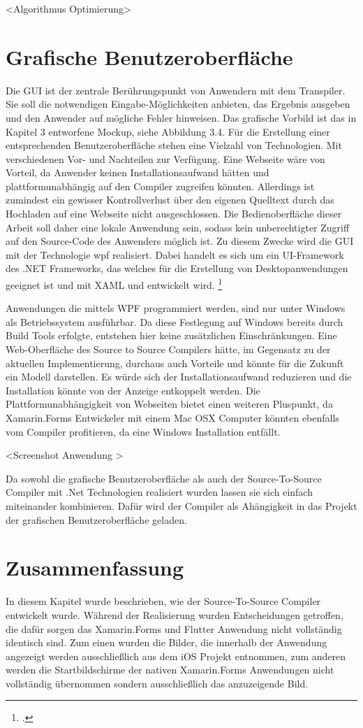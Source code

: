 <Algorithmus Optimierung>


\section{Grafische Benutzeroberfläche}
Die GUI ist der zentrale Berührungspunkt von Anwendern mit dem Transpiler.  Sie soll die notwendigen Eingabe-Möglichkeiten anbieten, das Ergebnis ausgeben und den Anwender auf mögliche Fehler hinweisen.  Das grafische Vorbild ist das in Kapitel 3 entworfene Mockup, siehe Abbildung 3.4.  Für die Erstellung einer entsprechenden Benutzeroberfläche stehen eine Vielzahl von Technologien. Mit verschiedenen Vor- und Nachteilen zur Verfügung.  Eine Webseite wäre von Vorteil, da Anwender keinen Installationsaufwand hätten und  plattformunabhängig auf den Compiler zugreifen könnten.  Allerdings ist zumindest ein gewisser Kontrollverlust über den eigenen Quelltext durch das  Hochladen auf eine Webseite nicht ausgeschlossen.  Die Bedienoberfläche dieser Arbeit soll daher eine lokale Anwendung sein, sodass kein  unberechtigter Zugriff auf den Source-Code des Anwenders möglich ist. Zu diesem Zwecke wird die GUI mit der Technologie \ac{wpf}  realisiert. Dabei handelt es sich um ein UI-Framework des .NET Frameworks, das welches für die Erstellung von Desktopanwendungen geeignet ist und mit XAML und \Csharp entwickelt wird. \footcite[Vgl.][S. 1f]{Wenger2012} 

Anwendungen die mittels WPF programmiert werden, sind nur unter Windows als Betriebssystem  ausführbar.  Da diese Festlegung auf Windows bereits durch Build Tools erfolgte, entstehen hier  keine zusätzlichen Einschränkungen. Eine Web-Oberfläche des Source to Source Compilers hätte, im Gegensatz zu der aktuellen  Implementierung, durchaus auch Vorteile und könnte für die Zukunft ein Modell darstellen.  Es würde sich der Installationsaufwand reduzieren und die Installation könnte von der 
Anzeige entkoppelt werden. Die Plattformunabhängigkeit von Webseiten bietet einen weiteren Pluspunkt,  da 
Xamarin.Forms Entwickeler mit einem Mac OSX Computer könnten ebenfalls vom Compiler  profitieren, da eine Windows Installation entfällt.

<Screenshot Anwendung >

Da sowohl die grafische Benutzeroberfläche als auch der Source-To-Source Compiler mit .Net Technologien realisiert wurden lassen sie sich einfach miteinander kombinieren.  Dafür wird der Compiler als Ahängigkeit in das Projekt der grafischen Benutzeroberfläche geladen.

\section{Zusammenfassung}
In diesem Kapitel wurde beschrieben, wie der Source-To-Source Compiler entwickelt wurde.  Während der Realisierung wurden Entscheidungen getroffen,  die dafür sorgen das Xamarin.Forms und Flutter Anwendung nicht vollständig identisch sind.  Zum einen wurden die Bilder, die innerhalb der Anwendung angezeigt werden ausschließlich aus dem iOS Projekt entnommen,  zum anderen werden die Startbildschirme der nativen Xamarin.Forms Anwendungen nicht vollständig übernommen sondern ausschließlich das anzuzeigende Bild. 
